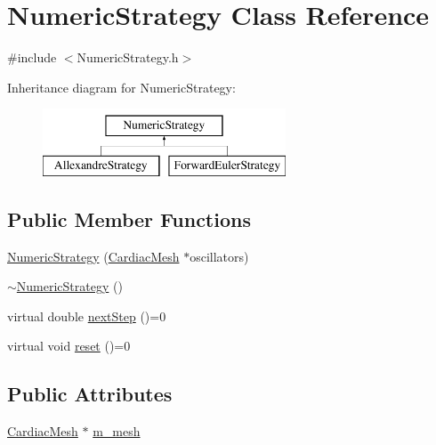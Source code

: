 \hypertarget{class_numeric_strategy}{\section{Numeric\+Strategy Class Reference}
\label{class_numeric_strategy}
}


{\ttfamily \#include $<$Numeric\+Strategy.\+h$>$}

Inheritance diagram for Numeric\+Strategy\+:\begin{figure}[H]
\begin{center}
\leavevmode
\includegraphics[height=2.000000cm]{class_numeric_strategy}
\end{center}
\end{figure}
\subsection*{Public Member Functions}
\begin{DoxyCompactItemize}
\item 
\hyperlink{class_numeric_strategy_a8f4a5e5be06427098e3a9b3635658786}{Numeric\+Strategy} (\hyperlink{class_cardiac_mesh}{Cardiac\+Mesh} $\ast$oscillators)
\item 
\hyperlink{class_numeric_strategy_ac167251a4c6409131a1be21ce3104870}{$\sim$\+Numeric\+Strategy} ()
\item 
virtual double \hyperlink{class_numeric_strategy_aeab387274e9d0ebf46a0e5ad5a5fe73f}{next\+Step} ()=0
\item 
virtual void \hyperlink{class_numeric_strategy_a81a1a510394e88edc2705e565d30f017}{reset} ()=0
\end{DoxyCompactItemize}
\subsection*{Public Attributes}
\begin{DoxyCompactItemize}
\item 
\hyperlink{class_cardiac_mesh}{Cardiac\+Mesh} $\ast$ \hyperlink{class_numeric_strategy_a2ca52f550fd3f1cc26c65aec0cacf2f6}{m\+\_\+mesh}
\end{DoxyCompactItemize}


